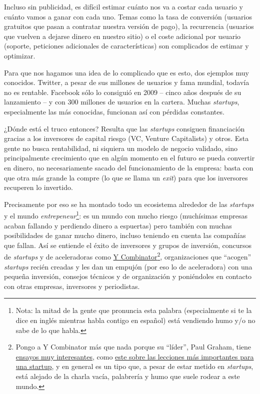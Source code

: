 \documentclass[nochap,palatino,shortheader]{apuntes}
\begin{document}
\begin{itemize}
Incluso sin publicidad, es difícil estimar cuánto nos va a costar cada usuario y cuánto vamos a ganar con cada uno. Temas como la tasa de conversión (usuarios gratuitos que pasan a contratar nuestra versión de pago), la recurrencia (usuarios que vuelven a dejarse dinero en nuestro sitio) o el coste adicional por usuario (soporte, peticiones adicionales de características) son complicados de estimar y optimizar.
\end{itemize}

Para que nos hagamos una idea de lo complicado que es esto, dos ejemplos muy conocidos. Twitter, a pesar de sus millones de usuarios y fama mundial, todavía no es rentable. Facebook sólo lo consiguió en 2009 -- cinco años después de su lanzamiento -- y con 300 millones de usuarios en la cartera. Muchas \textit{startups}, especialmente las más conocidas, funcionan así con pérdidas constantes.

¿Dónde está el truco entonces? Resulta que las \textit{startups} consiguen financiación gracias a los inversores de capital riesgo (VC, Venture Capitalists) y otros. Esta gente no busca rentabilidad, ni siquiera un modelo de negocio validado, sino principalmente crecimiento que en algún momento en el futuro se pueda convertir en dinero, no necesariamente sacado del funcionamiento de la empresa: basta con que otra más grande la compre (lo que se llama un \textit{exit}) para que los inversores recuperen lo invertido.

Precisamente por eso se ha montado todo un ecosistema alrededor de las \textit{startups} y el mundo \textit{entrepeneur}\footnote{Nota: la mitad de la gente que pronuncia esta palabra (especialmente si te la dice en inglés mientras habla contigo en español) está vendiendo humo y/o no sabe de lo que habla.}: es un mundo con mucho riesgo (muchísimas empresas acaban fallando y perdiendo dinero a espuertas) pero también con muchas posibilidades de ganar mucho dinero, incluso teniendo en cuenta las compañías que fallan. Así se entiende el éxito de inversores y grupos de inversión, concursos de \textit{startups} y de aceleradoras como \href{https://www.ycombinator.com/}{Y Combinator}\footnote{Pongo a Y Combinator más que nada porque su ``líder'', Paul Graham, tiene \href{http://paulgraham.com/articles.html}{ensayos muy interesantes}, como \href{http://paulgraham.com/startuplessons.html}{este sobre las lecciones más importantes para una startup}, y en general es un tipo que, a pesar de estar metido en \textit{startups}, está alejado de la charla vacía, palabrería y humo que suele rodear a este mundo.}, organizaciones que ``acogen'' \textit{startups} recién creadas y les dan un empujón (por eso lo de aceleradora) con una pequeña inversión, consejos técnicos y de organización y poniéndoles en contacto con otras empresas, inversores y periodistas.
\end{document}
